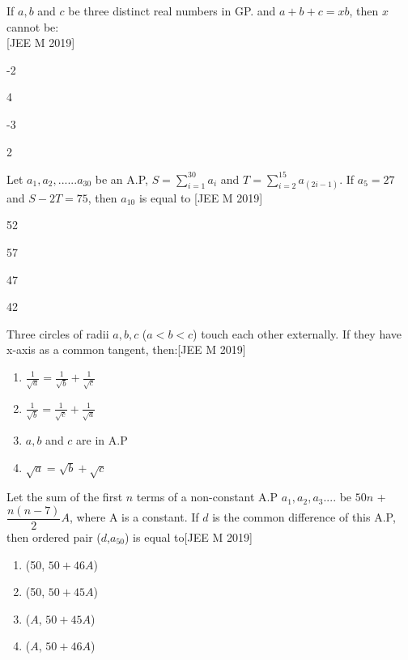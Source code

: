 \documentclass[journal,12pt,twocolumn]{IEEEtran}
\theoremstyle{remark}
\begin{document}
\begin{enumerate}
{{\begin{enumerate}
  \end{enumerate}}
  \item{If $a, b$ and $c$ be three distinct real numbers in GP. and $a+b+c=xb$, then $x$ cannot be:\\ \null \hfill{[JEE M 2019]}
\begin{enumerate}
  \begin{multicols}{2}
  \item {-2} \item{4}\columnbreak
  \item{-3}
  \item{2}
  \end{multicols}
  \end{enumerate}}
  \item {Let $a_{1},a_{2},......a_{30}$ be an A.P, $S=\sum_{i=1}^{30}a_{i}$ and $T=\sum_{i=2}^{15}a_{(2i-1)}$. If $a_{5}=27$
	  and $S-2T=75$, then $a_{10}$ is equal to \null \hfill{[JEE M 2019]}
\begin{enumerate}
  \begin{multicols}{2}
  \item {52} \item{57}\columnbreak
  \item{47}
  \item{42}
  \end{multicols}
  \end{enumerate}}
\item{Three circles of radii $a, b, c$ ($a<b<c$) touch each other externally. If they have x-axis as a common tangent, then:\hfill{[JEE M 2019]}\begin{enumerate} \itemsep.5em	
  
  \item {$\frac{1}{\sqrt{a}}=\frac{1}{\sqrt{b}}+\frac{1}{\sqrt{c}}$} 
  \item {$\frac{1}{\sqrt{b}}=\frac{1}{\sqrt{c}}+\frac{1}{\sqrt{a}}$} 
  \item{$a,b$ and $c$ are in A.P}
  \item{${\sqrt{a}}={\sqrt{b}}+{\sqrt{c}}$}
  \end{enumerate}} 
  \item{Let the sum of the first $n$ terms of a non-constant A.P $a_{1},a_{2},a_{3}$.... be $50n$ + $\dfrac{n(n-7)}{2}A$, where A is a constant. If $d$ is the common difference of this A.P, then ordered pair ($d$,$a_{50}$) is equal to\hfill{[JEE M 2019]}} \vspace{.5em}\begin{enumerate}
		  \itemsep.5em  \item {(50, $50+46A$)} \item{(50, $50+45A$)}
  \item{($A$, $50+45A$)}
  \item{($A$, $50+46A$)}
  \end{enumerate}}
  \end{enumerate}

  
\end{document}
